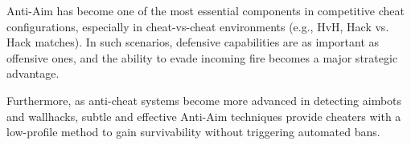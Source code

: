 Anti-Aim has become one of the most essential components in competitive cheat configurations, especially in cheat-vs-cheat environments (e.g., HvH, Hack vs. Hack matches). In such scenarios, defensive capabilities are as important as offensive ones, and the ability to evade incoming fire becomes a major strategic advantage.

Furthermore, as anti-cheat systems become more advanced in detecting aimbots and wallhacks, subtle and effective Anti-Aim techniques provide cheaters with a low-profile method to gain survivability without triggering automated bans.






\newpage
\newpage
\newpage
\newpage




